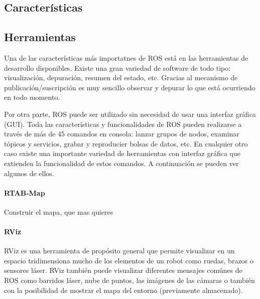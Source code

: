 \subsection{Características}

\subsection{Herramientas}
Una de las características más importatnes de ROS está en las herramientas de
desarrollo disponibles. Existe una gran variedad de software de todo tipo:
visualización, depuración, resumen del estado, etc. Gracias al mecanismo de
publicación/suscripción es muy sencillo observar y depurar lo que está
ocurriendo en todo momento.

Por otra parte, ROS puede ser utilizado sin necesidad de usar una interfaz
gráfica (GUI). Toda las características y funcionalidades de ROS pueden
realizarse a través de más de 45 comandos en consola: lanzar grupos de nodos,
examinar tópicos y servicios, grabar y reproducier bolsas de datos, etc. En
cualquier otro caso existe una importante variedad de herramientas con interfaz
gráfica que extienden la funcionalidad de estos comandos. A continuación se
pueden ver algunos de ellos.

\paragraph{RTAB-Map} \hspace{0pt}

Construir el mapa, que mas quieres

\paragraph{RViz} \hspace{0pt}

RViz es una herramienta de propósito general que permite visualizar en un
espacio tridimensiona mucho de los elementos de un robot como ruedas, brazos o
sensores láser. RViz también puede visualizar diferentes mensajes comúnes de ROS
como barridos láser, nube de puntos, las imágenes de las cámaras o también con
la posibilidad de mostrar el mapa del entorno (previamente almacenado).

